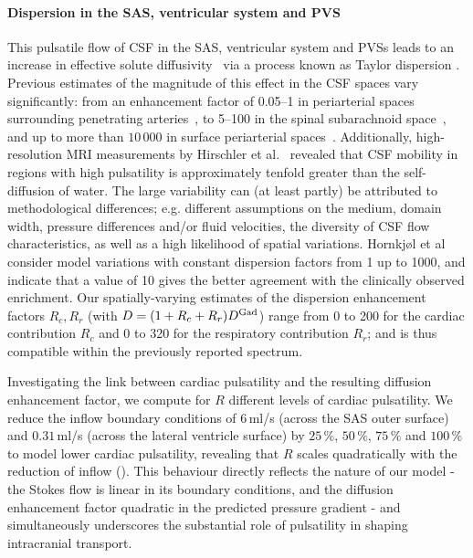 \documentclass[fleqn,10pt]{wlscirep}
\begin{document}
\paragraph{Dispersion in the SAS, ventricular system and PVS}
This pulsatile flow of CSF in the SAS, ventricular system and PVSs
leads to an increase in effective solute
diffusivity~\cite{stockman2007effect, hettiarachchi2011effect,
  asgari2016glymphatic, sharp2019dispersion, ray2021quantitative} via
a process known as Taylor dispersion \cite{taylor1953dispersion,
  watson1983diffusion}. Previous estimates of the magnitude of this
effect in the CSF spaces vary significantly: from an enhancement
factor of 0.05--1 in periarterial spaces surrounding penetrating
arteries~\cite{asgari2016glymphatic, troyetsky2021dispersion}, to
5--100 in the spinal subarachnoid space~\cite{stockman2007effect,
  hettiarachchi2011effect, sharp2019dispersion}, and up to more than
$10\,000$ in surface periarterial spaces~\cite{ray2021quantitative,
  sharp2019dispersion}.
Additionally, high-resolution MRI measurements by Hirschler et al.~\cite{hirschler2024region} revealed that CSF mobility in regions with high pulsatility is approximately tenfold greater than the self-diffusion of water.
The large variability can (at least partly) be
attributed to methodological differences; e.g. different assumptions
on the medium, domain width, pressure differences and/or fluid
velocities, the diversity of CSF flow characteristics, as well as a
high likelihood of spatial variations. Hornkjøl et
al~\cite{hornkjol2022csf} consider model variations with constant
dispersion factors from 1 up to 1000, and indicate that a value of 10
gives the better agreement with the clinically observed
enrichment. Our spatially-varying estimates of the dispersion
enhancement factors $R_c, R_r$ (with $D = (1 + R_c + R_r) D^{\rm
  Gad}$) range from 0 to 200 for the cardiac contribution $R_c$ and 0
to 320 for the respiratory contribution $R_r$; and is thus compatible
within the previously reported spectrum. 

Investigating the link between cardiac pulsatility and the resulting diffusion enhancement factor, we compute for $R$ different levels of cardiac pulsatility. We reduce the inflow boundary conditions of $6\,$ml/s (across the SAS outer surface) and $0.31\,$ml/s (across the lateral ventricle surface) by $25\,\%$, $50\,\%$, $75\,\%$ and $100\,\%$ to model lower cardiac pulsatility, revealing that $R$ scales quadratically with the reduction of inflow (). This behaviour directly reflects the nature of our model - the Stokes flow is linear in its boundary conditions, and the diffusion enhancement factor quadratic in the predicted pressure gradient - and simultaneously underscores the substantial role of pulsatility in shaping intracranial transport. 
\end{document}
